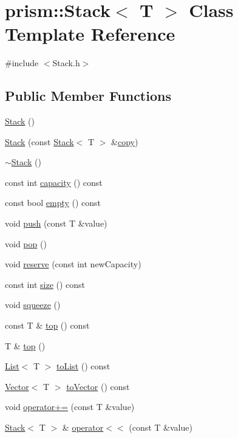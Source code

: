 \hypertarget{classprism_1_1_stack}{}\section{prism\+:\+:Stack$<$ T $>$ Class Template Reference}
\label{classprism_1_1_stack}


{\ttfamily \#include $<$Stack.\+h$>$}

\subsection*{Public Member Functions}
\begin{DoxyCompactItemize}
\item 
\hyperlink{classprism_1_1_stack_aa28cd4f7d2c39d7f3828460d662c3725}{Stack} ()
\item 
\hyperlink{classprism_1_1_stack_ae2de2835a81ce5f19d6463bb7641c44f}{Stack} (const \hyperlink{classprism_1_1_stack}{Stack}$<$ T $>$ \&\hyperlink{namespaceprism_ae776f4cd825f79e7af1cf6ee1d90a209}{copy})
\item 
\hyperlink{classprism_1_1_stack_afd4f167bfe42d9b432d3d107a4fc1657}{$\sim$\+Stack} ()
\item 
const int \hyperlink{classprism_1_1_stack_a0933dadf5810c98d2e7c0c6ea1b65a56}{capacity} () const 
\item 
const bool \hyperlink{classprism_1_1_stack_a5e7e52656e03bdea14680f59f61219f9}{empty} () const 
\item 
void \hyperlink{classprism_1_1_stack_a7fb1e3478da9ff6782e99142621f21f2}{push} (const T \&value)
\item 
void \hyperlink{classprism_1_1_stack_a9c5679c5b671e0fc79d00c53462686a4}{pop} ()
\item 
void \hyperlink{classprism_1_1_stack_ae4e7c5bfe1435e87b4d2b4bac5ff749b}{reserve} (const int new\+Capacity)
\item 
const int \hyperlink{classprism_1_1_stack_ae51ff6d366bbaca46e60e3445e74b52b}{size} () const 
\item 
void \hyperlink{classprism_1_1_stack_ac80cada72fa44835425cd86f530cd64b}{squeeze} ()
\item 
const T \& \hyperlink{classprism_1_1_stack_a5af5f0fa0b2011871f144014ecb9b706}{top} () const 
\item 
T \& \hyperlink{classprism_1_1_stack_ae31d2e2ea1b8c80b7c48b5d88e0465d0}{top} ()
\item 
\hyperlink{classprism_1_1_list}{List}$<$ T $>$ \hyperlink{classprism_1_1_stack_a3df4ac477d015a536aceaeed8a94de69}{to\+List} () const 
\item 
\hyperlink{classprism_1_1_vector}{Vector}$<$ T $>$ \hyperlink{classprism_1_1_stack_ac373a993c993bbf07a485a2838c9cae9}{to\+Vector} () const 
\item 
void \hyperlink{classprism_1_1_stack_a6a8ec445b5503fdc5e3358dd1b100a9c}{operator+=} (const T \&value)
\item 
\hyperlink{classprism_1_1_stack}{Stack}$<$ T $>$ \& \hyperlink{classprism_1_1_stack_a6b19a970604a4edc6cccbb61f226e9e9}{operator$<$$<$} (const T \&value)
\end{DoxyCompactItemize}
